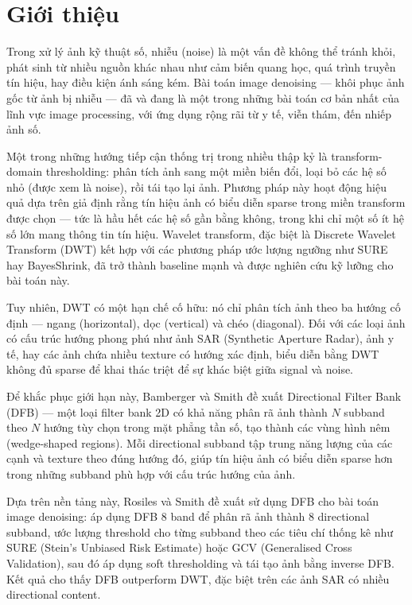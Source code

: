 \section{Giới thiệu}

Trong xử lý ảnh kỹ thuật số, nhiễu (noise) là một vấn đề không thể tránh khỏi, phát sinh từ nhiều nguồn khác nhau như cảm biến quang học, quá trình truyền tín hiệu, hay điều kiện ánh sáng kém. Bài toán image denoising --- khôi phục ảnh gốc từ ảnh bị nhiễu --- đã và đang là một trong những bài toán cơ bản nhất của lĩnh vực image processing, với ứng dụng rộng rãi từ y tế, viễn thám, đến nhiếp ảnh số.

Một trong những hướng tiếp cận thống trị trong nhiều thập kỷ là transform-domain thresholding: phân tích ảnh sang một miền biến đổi, loại bỏ các hệ số nhỏ (được xem là noise), rồi tái tạo lại ảnh. Phương pháp này hoạt động hiệu quả dựa trên giả định rằng tín hiệu ảnh có biểu diễn sparse trong miền transform được chọn --- tức là hầu hết các hệ số gần bằng không, trong khi chỉ một số ít hệ số lớn mang thông tin tín hiệu. Wavelet transform, đặc biệt là Discrete Wavelet Transform (DWT) kết hợp với các phương pháp ước lượng ngưỡng như SURE hay BayesShrink, đã trở thành baseline mạnh và được nghiên cứu kỹ lưỡng cho bài toán này.

Tuy nhiên, DWT có một hạn chế cố hữu: nó chỉ phân tích ảnh theo ba hướng cố định --- ngang (horizontal), dọc (vertical) và chéo (diagonal). Đối với các loại ảnh có cấu trúc hướng phong phú như ảnh SAR (Synthetic Aperture Radar), ảnh y tế, hay các ảnh chứa nhiều texture có hướng xác định, biểu diễn bằng DWT không đủ sparse để khai thác triệt để sự khác biệt giữa signal và noise.

Để khắc phục giới hạn này, Bamberger và Smith \cite{bamberger1992} đề xuất Directional Filter Bank (DFB) --- một loại filter bank 2D có khả năng phân rã ảnh thành $N$ subband theo $N$ hướng tùy chọn trong mặt phẳng tần số, tạo thành các vùng hình nêm (wedge-shaped regions). Mỗi directional subband tập trung năng lượng của các cạnh và texture theo đúng hướng đó, giúp tín hiệu ảnh có biểu diễn sparse hơn trong những subband phù hợp với cấu trúc hướng của ảnh.

Dựa trên nền tảng này, Rosiles và Smith \cite{rosiles2000} đề xuất sử dụng DFB cho bài toán image denoising: áp dụng DFB 8 band để phân rã ảnh thành 8 directional subband, ước lượng threshold cho từng subband theo các tiêu chí thống kê như SURE (Stein's Unbiased Risk Estimate) hoặc GCV (Generalised Cross Validation), sau đó áp dụng soft thresholding và tái tạo ảnh bằng inverse DFB. Kết quả cho thấy DFB outperform DWT, đặc biệt trên các ảnh SAR có nhiều directional content.


